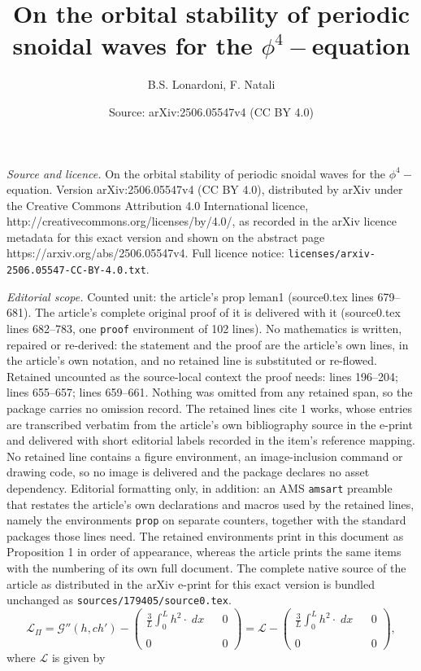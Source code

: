 \documentclass[10pt,a4paper]{amsart}
\title{On the orbital stability of periodic snoidal waves for the $\phi^4-$equation}
\author{B.S. Lonardoni, F. Natali}
\date{Source: arXiv:2506.05547v4 (CC BY 4.0)}
\begin{document}
\maketitle

\noindent\emph{Source and licence.} On the orbital stability of periodic snoidal waves for the $\phi^4-$equation. Version arXiv:2506.05547v4 (CC BY 4.0), distributed by arXiv under the Creative Commons Attribution 4.0 International licence, http://creativecommons.org/licenses/by/4.0/, as recorded in the arXiv licence metadata for this exact version and shown on the abstract page https://arxiv.org/abs/2506.05547v4. Full licence notice: \texttt{licenses/arxiv-2506.05547-CC-BY-4.0.txt}.\par\smallskip

\noindent\textit{Editorial scope.} Counted unit: the article's prop leman1 (source0.tex lines 679--681). The article's complete original proof of it is delivered with it (source0.tex lines 682--783, one \texttt{proof} environment of 102 lines). No mathematics is written, repaired or re-derived: the statement and the proof are the article's own lines, in the article's own notation, and no retained line is substituted or re-flowed.  Retained uncounted as the source-local context the proof needs: lines 196--204; lines 655--657; lines 659--661.  Nothing was omitted from any retained span, so the package carries no omission record.  The retained lines cite 1 works, whose entries are transcribed verbatim from the article's own bibliography source in the e-print and delivered with short editorial labels recorded in the item's reference mapping.  No retained line contains a figure environment, an image-inclusion command or drawing code, so no image is delivered and the package declares no asset dependency.  Editorial formatting only, in addition: an AMS \texttt{amsart} preamble that restates the article's own declarations and macros used by the retained lines, namely the environments \texttt{prop} on separate counters, together with the standard packages those lines need.  The retained environments print in this document as Proposition 1 in order of appearance, whereas the article prints the same items with the numbering of its own full document.  The complete native source of the article as distributed in the arXiv e-print for this exact version is bundled unchanged as \texttt{sources/179405/source0.tex}.
\begin{equation}\displaystyle\label{opconstrained2}\mathcal{L}_{\Pi}= \mathcal{G}''(h,ch')-\displaystyle \left(
\displaystyle	\begin{array}{ccc}
		\frac{3}{L}\int_{0}^{L} h^2 \cdot \; dx& & 0 \\\\
		0  & & 0
	\end{array}\right)=\displaystyle\mathcal{L}-\displaystyle \left(
\begin{array}{ccc}
\frac{3}{L}\int_{0}^{L} h^2\cdot \; dx & & 0 \\\\
0  & & 0
\end{array}\right),\end{equation} where $\mathcal{L}$ is given by
\end{document}
